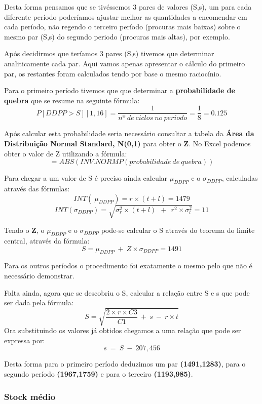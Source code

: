 \documentclass[a4paper]{article}
\begin{document}
Desta forma pensamos que se tivéssemos 3 pares de valores (S,s), um para cada diferente período poderíamos ajustar melhor as quantidades a encomendar em cada período, não regendo o terceiro período (procuras mais baixas) sobre o mesmo par (S,s) do segundo periodo (procuras mais altas), por exemplo.

Após decidirmos que teríamos 3 pares (S,s) tivemos que determinar analiticamente cada par. Aqui vamos apenas apresentar o cálculo do primeiro par, os restantes foram calculados tendo por base o mesmo raciocínio.

Para o primeiro período tivemos que que determinar a \textbf{probabilidade de quebra} que se resume na seguinte fórmula: 
 $$ P[DDPP > S][1,16] = \frac{1}{nº\ de\ ciclos\ no\ periodo} = \frac{1}{8} = 0.125$$
 
 Após calcular esta probabilidade seria necessário consultar a tabela da \textbf{Área da Distribuição Normal Standard, N(0,1)} para obter o \textbf{Z}. No Excel podemos obter o valor de Z utilizando a fórmula:
 $$ =ABS(INV.NORMP(probabilidade\ de\ quebra)) $$
 
 Para chegar a um valor de S é preciso ainda calcular $\mu_{DDPP}$ e o $\sigma_{DDPP}$, calculadas através das fórmulas:
 $$ INT(\ \mu_{DDPP}) = r \times (t + l) = 1479 $$
 $$ INT(\sigma_{DDPP}) = \sqrt{\sigma_{r}^2 \times (t + l)\ \ +\ \ r^2 \times \sigma_{l}^2} = 11 $$
 
 Tendo o \textbf{Z}, o \textbf{$\mu_{DDPP}$} e o \textbf{$\sigma_{DDPP}$} pode-se calcular o S através do teorema do limite central, através da fórmula:
 $$ S =  \mu_{DDPP}\ +\ Z \times \sigma_{DDPP} = 1491$$
 
 Para os outros períodos o procedimento foi exatamente o mesmo pelo que não é necessário demonstrar.
 
Falta ainda, agora que se descobriu o S, calcular a relação entre S e s que pode ser dada pela fórmula:
  $$ S = \sqrt{\frac{2 \times r \times C3}{C1}\ +\ s\ -\ r \times t} $$
Ora substituindo os valores já obtidos chegamos a uma relação que pode ser expressa por:
$$ s\ =\ S\ -\ 207,456 $$

Desta forma para o primeiro período deduzimos um par \textbf{(1491,1283)}, para o segundo período \textbf{(1967,1759)} e para o terceiro \textbf{(1193,985)}.


 \subsubsection{Stock médio}
 
\end{document}
